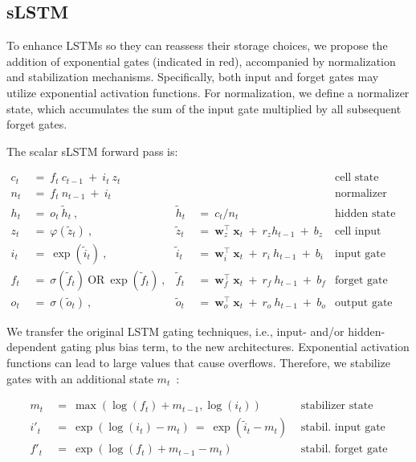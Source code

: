 \subsection{sLSTM}
\label{sec:sLSTM}

To enhance LSTMs so they can reassess their storage choices, we propose the addition of exponential gates (indicated in red), accompanied by normalization and stabilization mechanisms. Specifically, both input and forget gates may utilize exponential activation functions. For normalization, we define a normalizer state, which accumulates the sum of the input gate multiplied by all subsequent forget gates.

The scalar sLSTM forward pass is:

\begin{align}
\label{eq:slstmforward}
c_t \ &= \  f_t \ c_{t-1} \ + \ i_t \ z_t & & 
 &\text{cell state} \\
n_t \ &= \  f_t \ n_{t-1} \ + \ i_t  & & 
 &\text{normalizer state} \\
h_t \ &= \ o_t \ \tilde{h}_t \ ,
  &\tilde{h}_t \ &= \ c_t / n_t
&\text{hidden state} \\
z_t \ &= \ \varphi \left( \tilde{z}_t \right) \ , 
  &\tilde{z}_t \ &=  \ \mathbf{w}^\top_{z} \ \mathbf{x}_t \ + \
  r_{z}  h_{t-1} \ + \  b_{z}
  &\text{cell input} \\
i_t \ &= \ \!\exp \left( \tilde{i}_t  \right) \ , 
  &\tilde{i}_t \ &= \ \mathbf{w}^\top_{i} \ \mathbf{x}_t \ + \
  r_{i}  \ h_{t-1} \ + \  b_{i}
  &\text{input gate} \\
f_t \ &= \ \sigma \left(  \tilde{f}_t \right) \ \text{OR} \
\!\exp \left(  \tilde{f}_t \right) \ ,
  &\tilde{f}_t \ &= \ \mathbf{w}^\top_{f} \ \mathbf{x}_t  \ + \
  r_{f}  \ h_{t-1} \ + \  b_{f}
  &\text{forget gate} \\
o_t \ &= \ \sigma \left( \tilde{o}_t \right) \ , 
  &\tilde{o}_t  \ &= \ \mathbf{w}^\top_{o} \ \mathbf{x}_t \ + \
  r_{o}  \ h_{t-1} \ + \  b_{o}
  &\text{output gate} 
\end{align}

We transfer the original LSTM gating techniques, i.e., input- and/or hidden-dependent gating plus bias term, to the new architectures. Exponential activation functions can lead to large values that cause overflows. Therefore, we stabilize gates with an additional state \mbox{$m_t$~\citep{Milakov:18arxiv}}:

\begin{align}
\label{eq:slstmstabil}
m_t \ &= \ \max \left( \log ( f_t ) + m_{t-1} , \log ( i_t ) \right) &\text{stabilizer state} \\
i'_t \ &= \ \!\exp \left( \log \left ( i_t \right) - m_t \right) \ = \ \!\exp \left( \tilde{i}_t - m_t \right) \ \, 
  &\text{stabil. input gate} \\
f'_t \ &= \ \!\exp \left( \log \left( f_t \right) + m_{t-1} - m_t \right) \ \, 
  &\text{stabil. forget gate}
\end{align}

